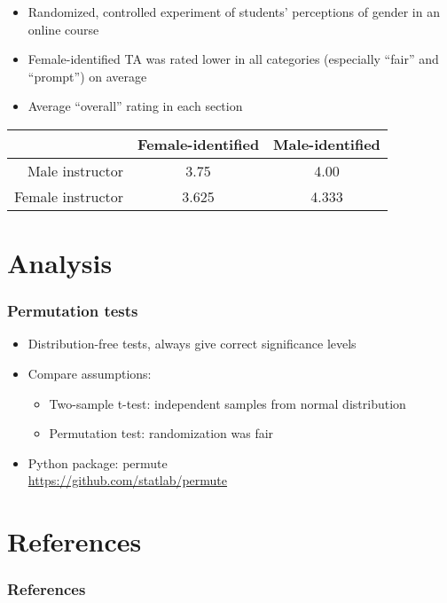 \documentclass{beamer}
\begin{document}
\frame
{
  \frametitle{\cite{MacNell2014}}
  \Large
\begin{itemize}
\item Randomized, controlled experiment of students' perceptions of gender in an online course
\item Female-identified TA was rated lower in all categories (especially ``fair'' and ``prompt'') on average
\item Average ``overall'' rating in each section
\end{itemize}
\begin{table}[htdp]
\begin{center}
\begin{tabular}{r|c|c|}
& Female-identified & Male-identified \\
\hline
Male instructor & 3.75 & 4.00\\
Female instructor & 3.625 & 4.333\\
\end{tabular}
\end{center}
\label{default}
\end{table}%


}

\section{Analysis}
\frame
{
 \frametitle{Permutation tests}
\Large
 \begin{itemize}
 \item Distribution-free tests, always give correct significance levels
 \item Compare assumptions:
 \begin{itemize}
 \item Two-sample t-test: independent samples from normal distribution
 \item Permutation test: randomization was fair
 \end{itemize}
 \item{Python package: permute \\
 \url{https://github.com/statlab/permute}
 }
 \end{itemize}

}

\section{References}
\begin{frame}
\frametitle{References}


\itemize
\end{frame}
\end{document}
